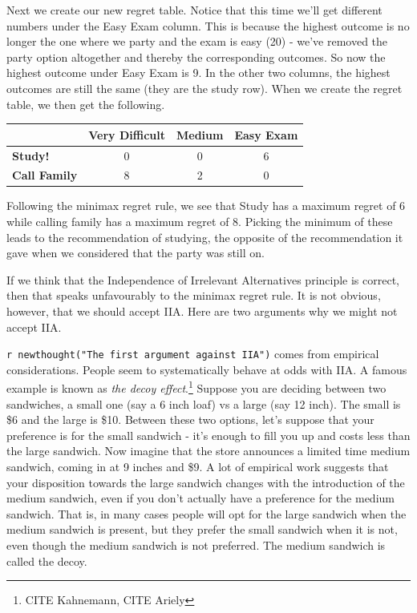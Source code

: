\documentclass[]{tufte-book}
\begin{document}
Next we create our new regret table. Notice that this time we'll get different numbers under the Easy Exam column. This is because the highest outcome is no longer the one where we party and the exam is easy (20) - we've removed the party option altogether and thereby the corresponding outcomes. So now the highest outcome under Easy Exam is 9. In the other two columns, the highest outcomes are still the same (they are the study row). When we create the regret table, we then get the following.

\begin{longtable}[]{@{}lccc@{}}
\toprule
& Very Difficult & Medium & Easy Exam\tabularnewline
\midrule
\endhead
\textbf{Study!} & 0 & 0 & 6\tabularnewline
\textbf{Call Family} & 8 & 2 & 0\tabularnewline
\bottomrule
\end{longtable}

Following the minimax regret rule, we see that Study has a maximum regret of 6 while calling family has a maximum regret of 8. Picking the minimum of these leads to the recommendation of studying, the opposite of the recommendation it gave when we considered that the party was still on.

If we think that the Independence of Irrelevant Alternatives principle is correct, then that speaks unfavourably to the minimax regret rule. It is not obvious, however, that we should accept IIA. Here are two arguments why we might not accept IIA.

\texttt{r\ newthought("The\ first\ argument\ against\ IIA")} comes from empirical considerations. People seem to systematically behave at odds with IIA. A famous example is known as \emph{the decoy effect}.\footnote{CITE Kahnemann, CITE Ariely} Suppose you are deciding between two sandwiches, a small one (say a 6 inch loaf) vs a large (say 12 inch). The small is \$6 and the large is \$10. Between these two options, let's suppose that your preference is for the small sandwich - it's enough to fill you up and costs less than the large sandwich. Now imagine that the store announces a limited time medium sandwich, coming in at 9 inches and \$9. A lot of empirical work suggests that your disposition towards the large sandwich changes with the introduction of the medium sandwich, even if you don't actually have a preference for the medium sandwich. That is, in many cases people will opt for the large sandwich when the medium sandwich is present, but they prefer the small sandwich when it is not, even though the medium sandwich is not preferred. The medium sandwich is called the decoy.
\end{document}
